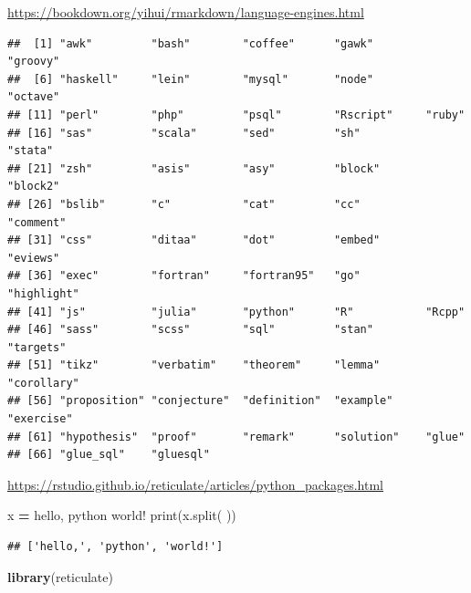 \documentclass[
]{book}
\newenvironment{Shaded}{\begin{snugshade}}{\end{snugshade}}
\newcommand{\BuiltInTok}[1]{#1}
\newcommand{\FunctionTok}[1]{\textcolor[rgb]{0.13,0.29,0.53}{\textbf{#1}}}
\newcommand{\NormalTok}[1]{#1}
\newcommand{\OperatorTok}[1]{\textcolor[rgb]{0.81,0.36,0.00}{\textbf{#1}}}
\newcommand{\SpecialCharTok}[1]{\textcolor[rgb]{0.81,0.36,0.00}{\textbf{#1}}}
\newcommand{\StringTok}[1]{\textcolor[rgb]{0.31,0.60,0.02}{#1}}
\theoremstyle{definition}
\theoremstyle{definition}
\theoremstyle{definition}
\theoremstyle{definition}
\theoremstyle{remark}
\begin{document}
\url{https://bookdown.org/yihui/rmarkdown/language-engines.html}

\begin{Shaded}
\end{Shaded}

\begin{verbatim}
##  [1] "awk"         "bash"        "coffee"      "gawk"        "groovy"     
##  [6] "haskell"     "lein"        "mysql"       "node"        "octave"     
## [11] "perl"        "php"         "psql"        "Rscript"     "ruby"       
## [16] "sas"         "scala"       "sed"         "sh"          "stata"      
## [21] "zsh"         "asis"        "asy"         "block"       "block2"     
## [26] "bslib"       "c"           "cat"         "cc"          "comment"    
## [31] "css"         "ditaa"       "dot"         "embed"       "eviews"     
## [36] "exec"        "fortran"     "fortran95"   "go"          "highlight"  
## [41] "js"          "julia"       "python"      "R"           "Rcpp"       
## [46] "sass"        "scss"        "sql"         "stan"        "targets"    
## [51] "tikz"        "verbatim"    "theorem"     "lemma"       "corollary"  
## [56] "proposition" "conjecture"  "definition"  "example"     "exercise"   
## [61] "hypothesis"  "proof"       "remark"      "solution"    "glue"       
## [66] "glue_sql"    "gluesql"
\end{verbatim}

\url{https://rstudio.github.io/reticulate/articles/python_packages.html}

\begin{Shaded}
\begin{Highlighting}[]
\NormalTok{x }\OperatorTok{=} \StringTok{\textquotesingle{}hello, python world!\textquotesingle{}}
\BuiltInTok{print}\NormalTok{(x.split(}\StringTok{\textquotesingle{} \textquotesingle{}}\NormalTok{))}
\end{Highlighting}
\end{Shaded}

\begin{verbatim}
## ['hello,', 'python', 'world!']
\end{verbatim}

\begin{Shaded}
\begin{Highlighting}[]
\FunctionTok{library}\NormalTok{(reticulate)}
\end{Highlighting}
\end{Shaded}
\end{document}
